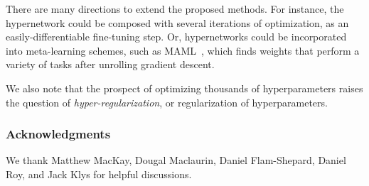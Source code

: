 \documentclass{article} %
\begin{document}
There are many directions to extend the proposed methods.
For instance, the hypernetwork could be composed with several iterations of optimization, as an easily-differentiable fine-tuning step.
Or, hypernetworks could be incorporated into meta-learning schemes, such as MAML~\citep{finn2017model}, which finds weights that perform a variety of tasks after unrolling gradient descent.

We also note that the prospect of optimizing thousands of hyperparameters raises the question of \emph{hyper-regularization}, or regularization of hyperparameters.
%


\subsubsection*{Acknowledgments}
We thank Matthew MacKay, Dougal Maclaurin, Daniel Flam-Shepard, Daniel Roy, and Jack Klys for helpful discussions.
\end{document}
